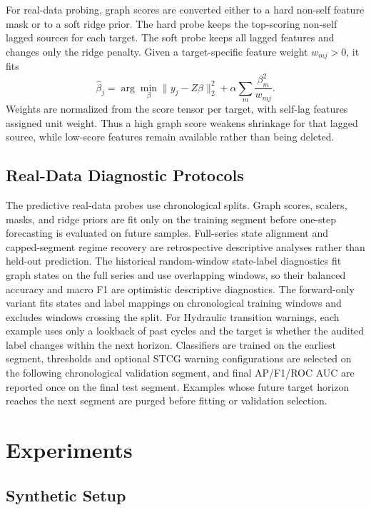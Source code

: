 \documentclass[sigconf,anonymous]{acmart}
\begin{document}
For real-data probing, graph scores are converted either to a hard non-self feature mask or to a soft ridge prior.
The hard probe keeps the top-scoring non-self lagged sources for each target.
The soft probe keeps all lagged features and changes only the ridge penalty.
Given a target-specific feature weight $w_{mj}>0$, it fits
\[
\hat{\beta}_j
= \arg\min_{\beta}
\|y_j-Z\beta\|_2^2 + \alpha \sum_m \frac{\beta_m^2}{w_{mj}}.
\]
Weights are normalized from the score tensor per target, with self-lag features assigned unit weight.
Thus a high graph score weakens shrinkage for that lagged source, while low-score features remain available rather than being deleted.

\subsection{Real-Data Diagnostic Protocols}

The predictive real-data probes use chronological splits.
Graph scores, scalers, masks, and ridge priors are fit only on the training segment before one-step forecasting is evaluated on future samples. Full-series state alignment and capped-segment regime recovery are retrospective descriptive analyses rather than held-out prediction.
The historical random-window state-label diagnostics fit graph states on the full series and use overlapping windows, so their balanced accuracy and macro F1 are optimistic descriptive diagnostics. The forward-only variant fits states and label mappings on chronological training windows and excludes windows crossing the split.
For Hydraulic transition warnings, each example uses only a lookback of past cycles and the target is whether the audited label changes within the next horizon.
Classifiers are trained on the earliest segment, thresholds and optional STCG warning configurations are selected on the following chronological validation segment, and final AP/F1/ROC AUC are reported once on the final test segment. Examples whose future target horizon reaches the next segment are purged before fitting or validation selection.

\section{Experiments}
\label{sec:experiments}

\subsection{Synthetic Setup}
\label{sec:exp-synthetic-setup}
\end{document}
